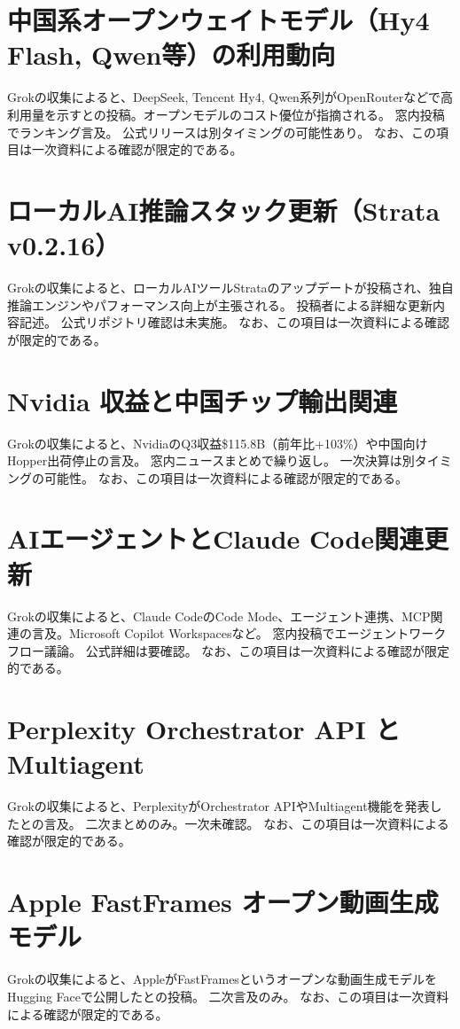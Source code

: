 \section{中国系オープンウェイトモデル（Hy4 Flash, Qwen等）の利用動向}
Grokの収集によると、DeepSeek, Tencent Hy4, Qwen系列がOpenRouterなどで高利用量を示すとの投稿。オープンモデルのコスト優位が指摘される。 窓内投稿でランキング言及。 公式リリースは別タイミングの可能性あり。 なお、この項目は一次資料による確認が限定的である。

\section{ローカルAI推論スタック更新（Strata v0.2.16）}
Grokの収集によると、ローカルAIツールStrataのアップデートが投稿され、独自推論エンジンやパフォーマンス向上が主張される。 投稿者による詳細な更新内容記述。 公式リポジトリ確認は未実施。 なお、この項目は一次資料による確認が限定的である。

\section{Nvidia 収益と中国チップ輸出関連}
Grokの収集によると、NvidiaのQ3収益\$115.8B（前年比+103\%）や中国向けHopper出荷停止の言及。 窓内ニュースまとめで繰り返し。 一次決算は別タイミングの可能性。 なお、この項目は一次資料による確認が限定的である。

\section{AIエージェントとClaude Code関連更新}
Grokの収集によると、Claude CodeのCode Mode、エージェント連携、MCP関連の言及。Microsoft Copilot Workspacesなど。 窓内投稿でエージェントワークフロー議論。 公式詳細は要確認。 なお、この項目は一次資料による確認が限定的である。

\section{Perplexity Orchestrator API と Multiagent}
Grokの収集によると、PerplexityがOrchestrator APIやMultiagent機能を発表したとの言及。 二次まとめのみ。一次未確認。 なお、この項目は一次資料による確認が限定的である。

\section{Apple FastFrames オープン動画生成モデル}
Grokの収集によると、AppleがFastFramesというオープンな動画生成モデルをHugging Faceで公開したとの投稿。 二次言及のみ。 なお、この項目は一次資料による確認が限定的である。

